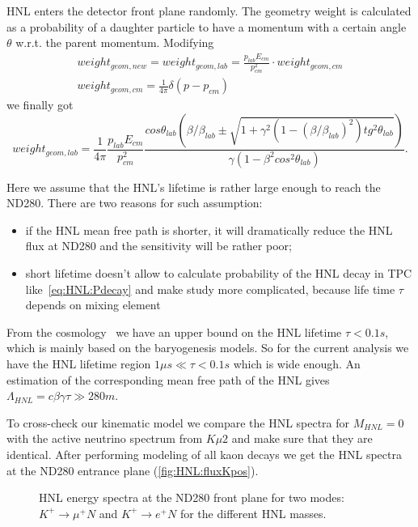 \documentclass[../main.tex]{subfiles}
\begin{document}
HNL enters the detector front plane randomly. The geometry weight is calculated as a probability of a daughter particle to have a momentum with a certain angle $\theta$ w.r.t. the parent momentum. Modifying
\begin{eqnarray}
    weight_{geom,new}=weight_{geom, lab}=\frac{p_{lab}E_{cm}}{p_{cm}^2}\cdot weight_{geom,cm}
    \nonumber \\
    weight_{geom, cm} = \frac{1}{4\pi}\delta\left(p-p_{cm}\right)
\end{eqnarray}
we finally got
\begin{equation}
    weight_{geom, lab}=\frac{1}{4\pi}\frac{p_{lab}E_{cm}}{p_{cm}^2}\frac{cos\theta_{lab}\left(\beta/\beta_{lab}\pm\sqrt{1+\gamma^2\left(1-\left(\beta/\beta_{lab}\right)^2\right)tg^2\theta_{lab}}\right)}{\gamma\left(1-\beta^{2}cos^{2}\theta_{lab}\right)}.
    \label{eq:HNL:lorentz}
\end{equation}

Here we assume that the HNL's lifetime is rather large enough to reach the ND280. There are two reasons for such assumption:
\begin{itemize}
    \item if the HNL mean free path is shorter, it will dramatically reduce the HNL flux at ND280 and the sensitivity will be rather poor;
    \item short lifetime doesn't allow to calculate probability of the HNL decay in TPC like~\autoref{eq:HNL:Pdecay} and make study more complicated, because life time $\tau$ depends on mixing element
\end{itemize}
From the cosmology~\cite{Gorbunov2007} we have an upper bound on the HNL lifetime  $\tau < 0.1s$, which is mainly based on the baryogenesis models. So for the current analysis we have the HNL lifetime region $1\mu s\ll\tau<0.1s$ which is wide enough. An estimation of the corresponding mean free path of the HNL gives $\Lambda_{HNL}=c\beta\gamma\tau\gg280 m$.

To cross-check our kinematic model we compare the HNL spectra for $M_{HNL}=0$ with the active neutrino spectrum from $K\mu2$ and make sure that they are identical. After performing modeling of all kaon decays we get the HNL spectra at the ND280 entrance plane (\autoref{fig:HNL:fluxKpos}).
\begin{figure}[!ht]
    \begin{minipage}{0.49\linewidth}
    \end{minipage}
    \hfill
    \begin{minipage}{0.49\linewidth}
    \end{minipage}
    \caption{HNL energy spectra at the ND280 front plane for two modes: $K^+\rightarrow \mu^+N$ and $K^+\rightarrow e^+N$ for the different HNL masses.}
    \label{fig:HNL:fluxKpos}
\end{figure}
\end{document}
